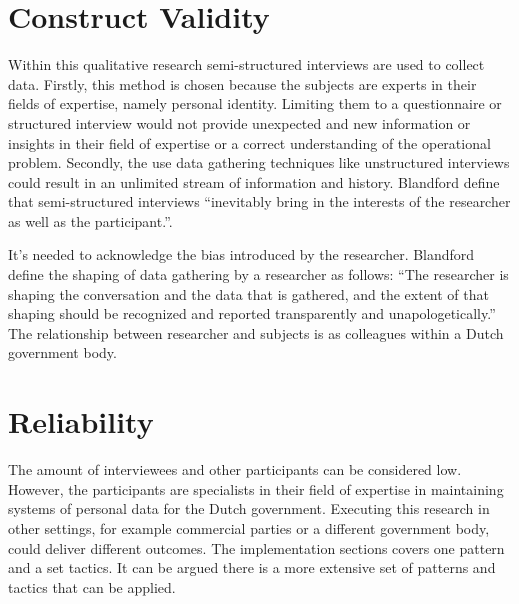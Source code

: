 \section{Construct Validity}
Within this qualitative research semi-structured interviews are used to collect data. Firstly, this method is chosen because the subjects are experts in their fields of expertise, namely personal identity. Limiting them to a questionnaire or structured interview would not provide unexpected and new information or insights in their field of expertise or a correct understanding of the operational problem. Secondly, the use data gathering techniques like unstructured interviews could result in an unlimited stream of information and history. Blandford \etal \cite{Blandford2016QualitativeHR} define that semi-structured interviews “inevitably bring in the interests of the researcher as well as the participant.”. 
\par
It’s needed to acknowledge the bias introduced by the researcher. Blandford \etal \cite{Blandford2016QualitativeHR} define the shaping of data gathering by a researcher as follows: “The researcher is shaping the conversation and the data that is gathered, and the extent of that shaping should be recognized and reported transparently and unapologetically.” The relationship between researcher and subjects is as colleagues within a Dutch government body.

\section{Reliability}
The amount of interviewees and other participants can be considered low. However, the participants are specialists in their field of expertise in maintaining systems of personal data for the Dutch government. Executing this research in other settings, for example commercial parties or a different government body, could deliver different outcomes.
The implementation sections covers one pattern and a set tactics. It can be argued there is a more extensive set of patterns and tactics that can be applied.
